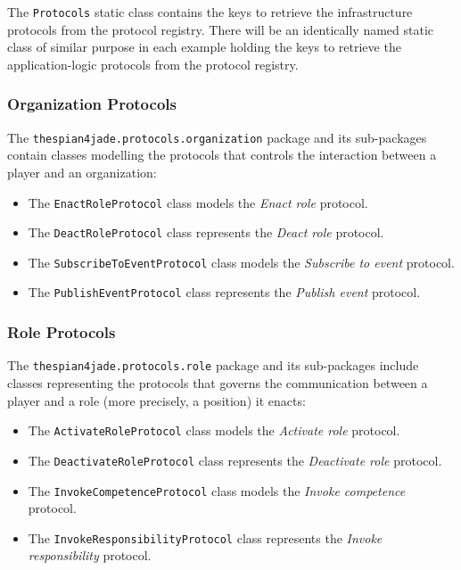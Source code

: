 The \texttt{Protocols} static class contains the keys to retrieve the infrastructure protocols from the protocol registry.
There will be an identically named static class of similar purpose in each example holding the keys to retrieve the application-logic protocols from the protocol registry. 

\subsubsection{Organization Protocols}

The \texttt{thespian4jade.protocols.organization} package and its sub-packages contain classes modelling the protocols that controls the interaction between a player and an organization:
\begin{itemize}
	\item The \texttt{EnactRoleProtocol} class models the \textit{Enact role} protocol.
	\item The \texttt{DeactRoleProtocol} class represents the \textit{Deact role} protocol.
	\item The \texttt{SubscribeToEventProtocol} class models the \textit{Subscribe to event} protocol.
	\item The \texttt{PublishEventProtocol} class represents the \textit{Publish event} protocol.
\end{itemize}

\subsubsection{Role Protocols}

The \texttt{thespian4jade.protocols.role} package and its sub-packages include classes representing the protocols that governs the communication between a player and a role (more precisely, a position) it enacts:
\begin{itemize}
	\item The \texttt{ActivateRoleProtocol} class models the \textit{Activate role} protocol.
	\item The \texttt{DeactivateRoleProtocol} class represents the \textit{Deactivate role} protocol.
	\item The \texttt{InvokeCompetenceProtocol} class models the \textit{Invoke competence} protocol.
	\item The \texttt{InvokeResponsibilityProtocol} class represents the \textit{Invoke responsibility} protocol.
\end{itemize}


